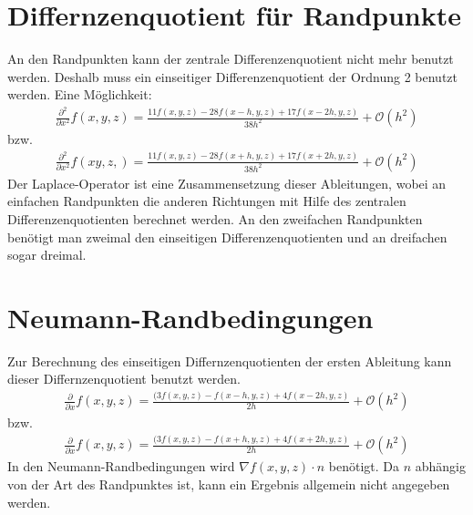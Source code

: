 \documentclass[pdflatex,12pt,a4paper,twoside]{scrartcl}
\begin{document}
\section{Differnzenquotient für Randpunkte}
An den Randpunkten kann der zentrale Differenzenquotient nicht mehr benutzt werden.
Deshalb muss ein einseitiger Differenzenquotient der Ordnung 2 benutzt werden.
Eine Möglichkeit:
\begin{align*}
\frac{\partial^2}{\partial x^2}f(x,y,z)=\frac{11f(x,y,z)-28f(x-h,y,z)+17f(x-2h,y,z)}{38h^2}+\mathcal O(h^2)
\end{align*}
bzw.
\begin{align*}
\frac{\partial^2}{\partial x^2}f(xy,z,)=\frac{11f(x,y,z)-28f(x+h,y,z)+17f(x+2h,y,z)}{38h^2}+\mathcal O(h^2)
\end{align*}
Der Laplace-Operator ist eine Zusammensetzung dieser Ableitungen, wobei an einfachen Randpunkten die anderen Richtungen mit Hilfe des zentralen Differenzenquotienten berechnet werden.
An den zweifachen Randpunkten benötigt man zweimal den einseitigen Differenzenquotienten und an dreifachen sogar dreimal.

\section{Neumann-Randbedingungen}
Zur Berechnung des einseitigen Differnzenquotienten der ersten Ableitung kann dieser Differnzenquotient benutzt werden.
\begin{align*}
\frac{\partial}{\partial x}f(x,y,z)=\frac{(3f(x,y,z)-f(x-h,y,z)+4f(x-2h,y,z)}{2h}+\mathcal O(h^2)
\end{align*}
bzw.
\begin{align*}
\frac{\partial}{\partial x}f(x,y,z)=\frac{(3f(x,y,z)-f(x+h,y,z)+4f(x+2h,y,z)}{2h}+\mathcal O(h^2)
\end{align*} 
In den Neumann-Randbedingungen wird $\nabla f(x,y,z) \cdot n$ benötigt. Da $n$ abhängig von der Art des Randpunktes ist, kann ein Ergebnis allgemein nicht angegeben werden.
\end{document}
